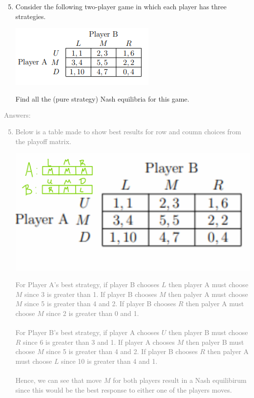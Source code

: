 \documentclass[11pt]{article}
\begin{document}
\begin{enumerate}
	\setcounter{enumi}{4}
	\item Consider the following two-player game in which each player has three strategies.\\
	\begin{center}
		\includegraphics[scale=1.0]{Figure1.3}\\
	\end{center}
	Find all the (pure strategy) Nash equilibria for this game.\\
\end{enumerate}
\textcolor{gray}{
Answers:
\begin{enumerate}
	\setcounter{enumi}{4}
	\item  Below is a table made to show best results for row and coumn choices from the playoff matrix.\\
	\begin{center}
		\includegraphics[scale=0.45]{Figure1.6}\\
	\end{center}
	For Player A's best strategy, if player B chooses $L$ then player A must choose $M$ since 3 is greater than 1. If player B chooses $M$ then palyer A must choose $M$ since 5 is greater than 4 and 2.   If player B chooses $R$ then palyer A must choose $M$ since 2 is greater than 0 and 1.\\\\
	For Player B's best strategy, if player A chooses $U$ then player B must choose $R$ since 6 is greater than 3 and 1. If player A chooses $M$ then palyer B must choose $M$ since 5 is greater than 4 and 2.   If player B chooses $R$ then palyer A must choose $L$ since 10 is greater than 4 and 1.\\\\  
Hence, we can see that move $M$ for both players result in a Nash equilibirum since this would be the best response to either one of the players moves. 
\end{enumerate}
}
\end{document}
